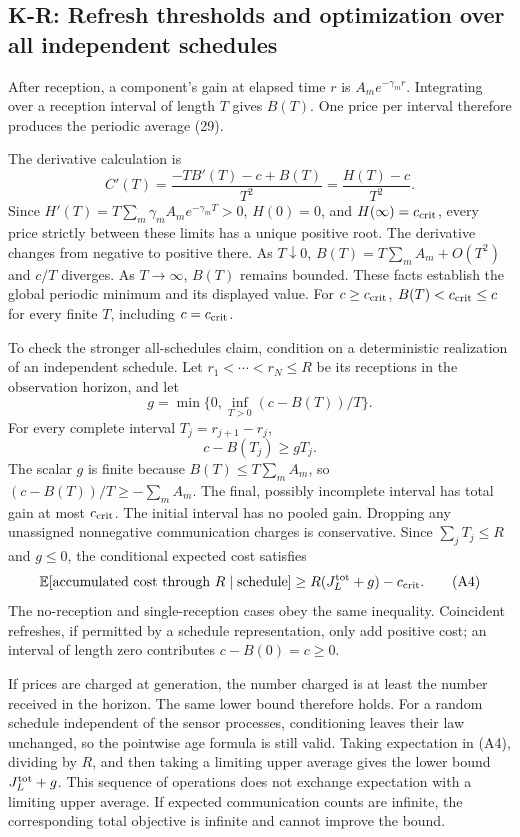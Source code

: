 \documentclass[11pt,letterpaper]{article}
\newcommand{\E}{\mathbb E}
\newcommand{\calculation}[2]{\subsection{#1: #2}}
\begin{document}
\calculation{K-R}{Refresh thresholds and optimization over all independent schedules}
After reception, a component's gain at elapsed time $r$ is $A_m e^{-\gamma_m r}$. Integrating over a reception interval of length $T$ gives $B(T)$. One price per interval therefore produces the periodic average (29).

The derivative calculation is
\[
C'(T)=\frac{-TB'(T)-c+B(T)}{T^2}
=\frac{H(T)-c}{T^2}.
\]
Since $H'(T)=T\sum_m\gamma_m A_m e^{-\gamma_mT}>0$,
$H(0)=0$, and $H(\infty)=c_{\rm crit}$, every price strictly between these limits has a unique positive root. The derivative changes from negative to positive there. As $T\downarrow0$, $B(T)=T\sum_m A_m+O(T^2)$ and $c/T$ diverges. As $T\to\infty$, $B(T)$ remains bounded. These facts establish the global periodic minimum and its displayed value. For $c\ge c_{\rm crit}$, $B(T)<c_{\rm crit}\le c$ for every finite $T$, including $c=c_{\rm crit}$.

To check the stronger all-schedules claim, condition on a deterministic realization of an independent schedule. Let $r_1<\cdots<r_N\le R$ be its receptions in the observation horizon, and let
\[
g=\min\{0,\inf_{T>0}(c-B(T))/T\}.
\]
For every complete interval $T_j=r_{j+1}-r_j$,
\[
c-B(T_j)\ge gT_j.
\]
The scalar $g$ is finite because $B(T)\le T\sum_m A_m$, so $(c-B(T))/T\ge-\sum_m A_m$.
The final, possibly incomplete interval has total gain at most $c_{\rm crit}$. The initial interval has no pooled gain. Dropping any unassigned nonnegative communication charges is conservative. Since $\sum_jT_j\le R$ and $g\le0$, the conditional expected cost satisfies
\begin{equation}
\E[\text{accumulated cost through }R\mid\text{schedule}]
\ge R(J_L^{\rm tot}+g)-c_{\rm crit}.
\tag{A4}
\end{equation}
The no-reception and single-reception cases obey the same inequality. Coincident refreshes, if permitted by a schedule representation, only add positive cost; an interval of length zero contributes $c-B(0)=c\ge0$.

If prices are charged at generation, the number charged is at least the number received in the horizon. The same lower bound therefore holds. For a random schedule independent of the sensor processes, conditioning leaves their law unchanged, so the pointwise age formula is still valid. Taking expectation in (A4), dividing by $R$, and then taking a limiting upper average gives the lower bound $J_L^{\rm tot}+g$. This sequence of operations does not exchange expectation with a limiting upper average. If expected communication counts are infinite, the corresponding total objective is infinite and cannot improve the bound.
\end{document}
